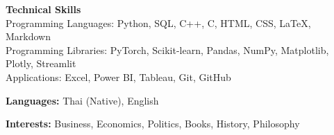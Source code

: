 \documentclass[a4paper, 11pt]{article}
\begin{document}
\textbf{Technical Skills}\\
\hspace*{7pt} Programming Languages: Python, SQL, C++, C, HTML, CSS, LaTeX, Markdown\\
\hspace*{7pt} Programming Libraries: PyTorch, Scikit-learn, Pandas, NumPy, Matplotlib, Plotly, Streamlit\\
\hspace*{7pt} Applications: Excel, Power BI, Tableau, Git, GitHub

\textbf{Languages:} Thai (Native), English

\textbf{Interests:} Business, Economics, Politics, Books, History, Philosophy
\end{document}
